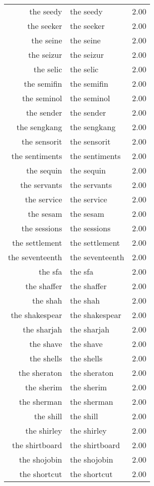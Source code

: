 \begin{table}[ht]
\begin{tabular}{rlr}
  the seedy & the seedy & 2.00 \\ 
  the seeker & the seeker & 2.00 \\ 
  the seine & the seine & 2.00 \\ 
  the seizur & the seizur & 2.00 \\ 
  the selic & the selic & 2.00 \\ 
  the semifin & the semifin & 2.00 \\ 
  the seminol & the seminol & 2.00 \\ 
  the sender & the sender & 2.00 \\ 
  the sengkang & the sengkang & 2.00 \\ 
  the sensorit & the sensorit & 2.00 \\ 
  the sentiments & the sentiments & 2.00 \\ 
  the sequin & the sequin & 2.00 \\ 
  the servants & the servants & 2.00 \\ 
  the service & the service & 2.00 \\ 
  the sesam & the sesam & 2.00 \\ 
  the sessions & the sessions & 2.00 \\ 
  the settlement & the settlement & 2.00 \\ 
  the seventeenth & the seventeenth & 2.00 \\ 
  the sfa & the sfa & 2.00 \\ 
  the shaffer & the shaffer & 2.00 \\ 
  the shah & the shah & 2.00 \\ 
  the shakespear & the shakespear & 2.00 \\ 
  the sharjah & the sharjah & 2.00 \\ 
  the shave & the shave & 2.00 \\ 
  the shells & the shells & 2.00 \\ 
  the sheraton & the sheraton & 2.00 \\ 
  the sherim & the sherim & 2.00 \\ 
  the sherman & the sherman & 2.00 \\ 
  the shill & the shill & 2.00 \\ 
  the shirley & the shirley & 2.00 \\ 
  the shirtboard & the shirtboard & 2.00 \\ 
  the shojobin & the shojobin & 2.00 \\ 
  the shortcut & the shortcut & 2.00 \\ 

\end{tabular}
\end{table}
